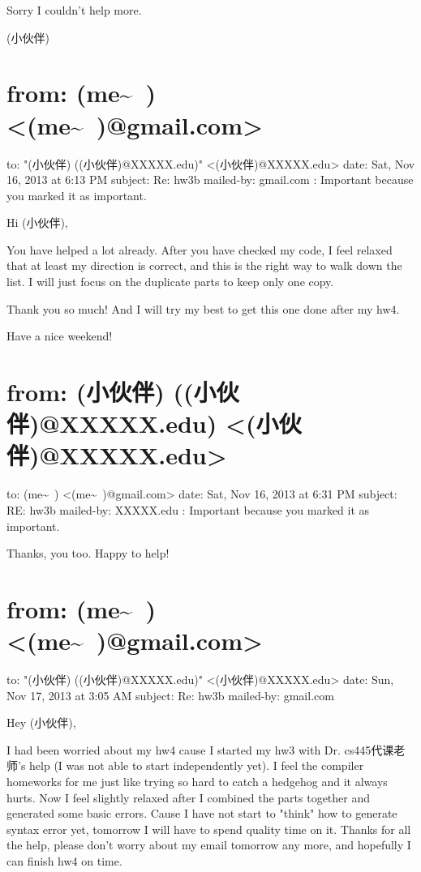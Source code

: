 \documentclass[12pt]{book}
\begin{document}
Sorry I couldn't help more.

(小伙伴)

\section{from:         (me\textasciitilde{}~) <(me\textasciitilde{}~)@gmail.com>}
\label{sec-38-6}
to:         "(小伙伴) ((小伙伴)@XXXXX.edu)" <(小伙伴)@XXXXX.edu>
date:         Sat, Nov 16, 2013 at 6:13 PM
subject:         Re: hw3b
mailed-by:         gmail.com
:         Important because you marked it as important.

Hi (小伙伴), 

You have helped a lot already. After you have checked my code, I feel relaxed that at least my direction is correct, and this is the right way to walk down the list. I will just focus on the duplicate parts to keep only one copy. 

Thank you so much! And I will try my best to get this one done after my hw4. 

Have a nice weekend!

\section{from:         (小伙伴) ((小伙伴)@XXXXX.edu) <(小伙伴)@XXXXX.edu>}
\label{sec-38-7}
to:         (me\textasciitilde{}~) <(me\textasciitilde{}~)@gmail.com>
date:         Sat, Nov 16, 2013 at 6:31 PM
subject:         RE: hw3b
mailed-by:         XXXXX.edu
:         Important because you marked it as important.

Thanks, you too. Happy to help!

\section{from:         (me\textasciitilde{}~) <(me\textasciitilde{}~)@gmail.com>}
\label{sec-38-8}
to:         "(小伙伴) ((小伙伴)@XXXXX.edu)" <(小伙伴)@XXXXX.edu>
date:         Sun, Nov 17, 2013 at 3:05 AM
subject:         Re: hw3b
mailed-by:         gmail.com

Hey (小伙伴), 

I had been worried about my hw4 cause I started my hw3 with Dr. cs445代课老师's help (I was not able to start independently yet). I feel the compiler homeworks for me just like trying so hard to catch a hedgehog and it always hurts. Now I feel slightly relaxed after I combined the parts together and generated some basic errors. Cause I have not start to "think" how to generate syntax error yet, tomorrow I will have to spend quality time on it. Thanks for all the help, please don't worry about my email tomorrow any more, and hopefully I can finish hw4 on time. 
\end{document}
